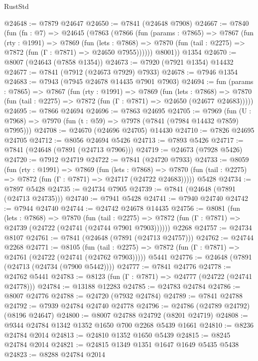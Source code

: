 \begin{lexlean}{RustStd}
\begin{coremodule}
@24648 := @7879 @24647
@24650 := @7841 (@24648 @7908)
@24667 := @7840
    (fun (fn : @7) =>
    @24645
      (@7863
        (@7866
          (fun (params : @7865) =>
          @7867
            (fun (rty : @1991) =>
            @7869
              (fun (lets : @7868) =>
              @7870 (fun (tail : @2275) => @7872 (fun (Γ : @7871) => @24650 @7955))))))
        @8001))
    @1354
@24670 := @8007 (@24643 (@7858 @1354))
@24673 := @7920 (@7921 @1354) @14432
@24677 := @7841 (@7912 (@24673 @7929) @7933)
@24678 := @7946 @1354
@24683 := @7943 (@7945 @24678 @14435 @7901 @7903)
@24694 := fun (params : @7865) =>
  @7867
    (fun (rty : @1991) =>
    @7869
      (fun (lets : @7868) =>
      @7870 (fun (tail : @2275) => @7872 (fun (Γ : @7871) => @24650 (@24677 @24683)))))
@24695 := @7866 @24694
@24696 := @7863 @24695
@24705 := @7969
    (fun (U : @7968) => @7970 (fun (t : @59) => @7978 (@7841 (@7984 @14432 @7859) @7995)))
@24708 := @24670 (@24696 @24705) @14430
@24710 := @7826 @24695 @24705
@24712 := @8056 @24694 @5426
@24713 := @7893 @5426
@24717 := @7841 (@24648 (@7891 (@24713 @7906)))
@24719 := @24673 (@7928 @5426)
@24720 := @7912 @24719
@24722 := @7841 (@24720 @7933)
@24733 := @8059
    (fun (rty : @1991) =>
    @7869
      (fun (lets : @7868) =>
      @7870 (fun (tail : @2275) => @7872 (fun (Γ : @7871) => @24717 (@24722 @24683)))))
    @5428
@24734 := @7897 @5428
@24735 := @24734 @7905
@24739 := @7841 (@24648 (@7891 (@24713 @24735)))
@24740 := @7941 @5428
@24741 := @7940 @24740
@24742 := @7944 @24740
@24744 := @24742 @24678 @14435
@24756 := @8081
    (fun (lets : @7868) =>
    @7870
      (fun (tail : @2275) =>
      @7872 (fun (Γ : @7871) => @24739 (@24722 (@24741 (@24744 @7901 @7903))))))
    @2268
@24757 := @24734 @8107
@24761 := @7841 (@24648 (@7891 (@24713 @24757)))
@24762 := @24744 @2268
@24771 := @8105
    (fun (tail : @2275) => @7872 (fun (Γ : @7871) => @24761 (@24722 (@24741 (@24762 @7903)))))
    @5441
@24776 := @24648 (@7891 (@24713 (@24734 (@7900 @5442))))
@24777 := @7841 @24776
@24778 := @24762 @5441
@24783 := @8123 (fun (Γ : @7871) => @24777 (@24722 (@24741 @24778)))
@24784 := @13188 @12283
@24785 := @24783 @24784
@24786 := @8007 @24776
@24788 := @24720 (@7932 @24784)
@24789 := @7841 @24788
@24792 := @7939 @24784 @24740 @24778
@24796 := @24786 (@24789 @24792) (@8196 @24647)
@24800 := @8007 @24788 @24792 (@8201 @24719)
@24808 := @9344 @24784 @1342 @1352 @1650 @700 @2268 @5439 @1661
@24810 := @8236 @24784 @2014
@24813 := @24810 @1352 @1650 @5439
@24815 := @8245 @24784 @2014
@24821 := @24815 @1349 @1351 @1647 @1649 @5435 @5438
@24823 := @8288 @24784 @2014

\end{coremodule}
\end{lexlean}
